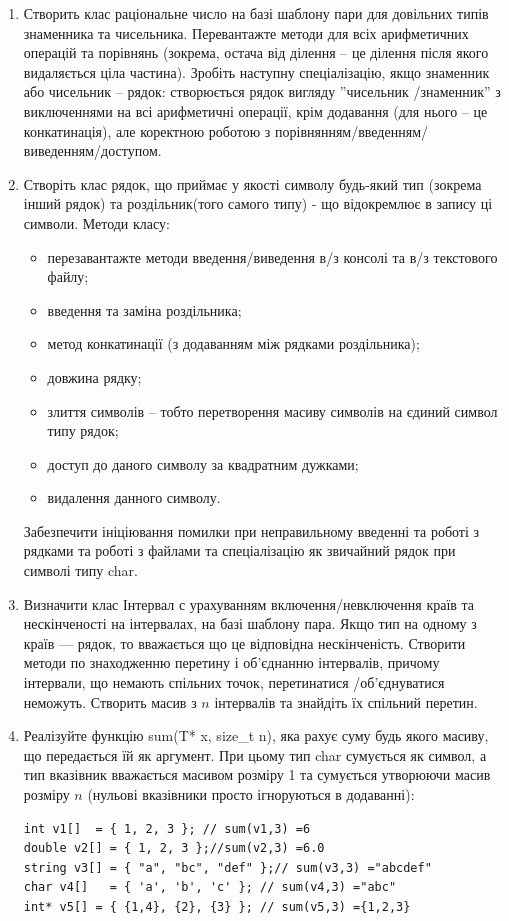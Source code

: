 \documentclass[a5paper,titlepage,openany,twoside,draft]{book_unv}%
\begin{document}
\begin{enumerate}
\item
Створить клас раціональне число на базі шаблону пари для довільних типів знаменника та чисельника.
Перевантажте методи для всіх арифметичних операцій та порівнянь 
(зокрема, остача від ділення -- це ділення після якого видаляється ціла частина). 
Зробіть наступну спеціалізацію, якщо знаменник або чисельник -- рядок:
створюється рядок вигляду ''{чисельник} /{знаменник}'' з виключеннями на всі арифметичні операції,
крім додавання (для нього -- це конкатинація), але коректною роботою з 
порівнянням/введенням/виведенням/доступом.

\item
Створіть клас рядок, що приймає у якості символу будь-який тип (зокрема інший рядок) 
та роздільник(того самого типу) - що відокремлює в запису ці символи. 
Методи класу:
\begin{itemize}
\item
перезавантажте методи введення/виведення в/з консолі та в/з текстового файлу;
\item
введення та заміна роздільника;
\item
метод конкатинації (з додаванням між рядками роздільника);
\item
довжина рядку;
\item
злиття символів -- тобто перетворення масиву символів на єдиний символ типу рядок;
\item
доступ до даного символу за квадратним дужками;
\item
видалення данного символу.
\end{itemize}
Забезпечити ініціювання помилки при неправильному введенні та роботі з рядками 
та роботі з файлами та спеціалізацію як звичайний рядок при символі типу char.

\item
Визначити клас Інтервал с урахуванням включення/невключення країв та нескінченості на інтервалах,
на базі шаблону пара. Якщо тип на одному з країв --- рядок, то вважається 
що це відповідна нескінченість.  
Створити методи по знаходженню перетину і об'єднанню інтервалів, 
причому інтервали, що немають спільних точок, перетинатися /об'єднуватися неможуть. 
Створить масив з $n$ інтервалів та знайдіть їх спільний перетин.
 
\item
Реалізуйте функцію sum(T* x, size\_t n), яка рахує суму будь якого масиву, що передається їй як аргумент.
При цьому тип char сумується як символ, а тип вказівник вважається масивом розміру 1 та сумується утворюючи 
масив розміру $n$ (нульові вказівники просто ігноруються в додаванні):
\begin{verbatim}
int v1[]  = { 1, 2, 3 }; // sum(v1,3) =6 
double v2[] = { 1, 2, 3 };//sum(v2,3) =6.0 
string v3[] = { "a", "bc", "def" };// sum(v3,3) ="abcdef"
char v4[]   = { 'a', 'b', 'c' }; // sum(v4,3) ="abc"
int* v5[] = { {1,4}, {2}, {3} }; // sum(v5,3) ={1,2,3}
\end{verbatim}


\end{enumerate}
\end{document}
